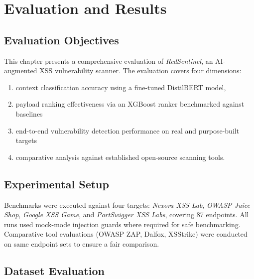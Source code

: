 \chapter{Evaluation and Results} 
\section{Evaluation Objectives}
This chapter presents a comprehensive evaluation of \textit{RedSentinel}, an AI-augmented XSS vulnerability scanner. The evaluation covers four dimensions:
\begin{enumerate}[itemsep=2pt, topsep=-15pt]
    \item context classification accuracy using a fine-tuned DistilBERT model,
    \item payload ranking effectiveness via an XGBoost ranker benchmarked against baselines
    \item end-to-end vulnerability detection performance on real and purpose-built targets
    \item comparative analysis against established open-source scanning tools.
\end{enumerate}
\section{Experimental Setup}
Benchmarks were executed against four targets: \textit{Nexora XSS Lab}, \textit{OWASP Juice Shop}, \textit{Google XSS Game}, and \textit{PortSwigger XSS Labs}, covering 87 endpoints. All runs used mock-mode injection guards where required for safe benchmarking. Comparative tool evaluations (OWASP ZAP, Dalfox, XSStrike) were conducted on same endpoint sets to ensure a fair comparison.
 

\section{Dataset Evaluation}

 
